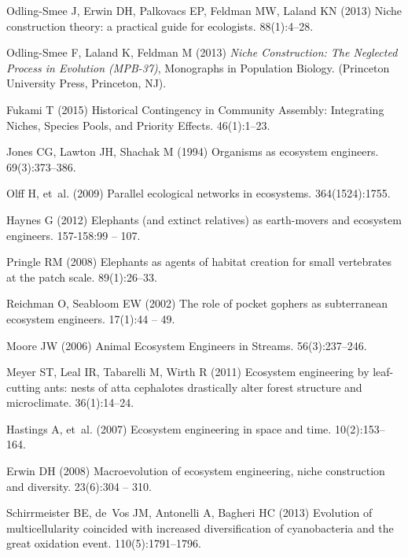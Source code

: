 \documentclass[9pt,twocolumn,twoside]{pnas-new}
\begin{document}
\begin{thebibliography}{10}
Odling-Smee J, Erwin DH, Palkovacs EP, Feldman MW, Laland KN (2013) {Niche
  construction theory: a practical guide for ecologists.}
 88(1):4--28.

Odling-Smee F, Laland K, Feldman M (2013) {\em Niche Construction: The
  Neglected Process in Evolution (MPB-37)}, Monographs in Population Biology.
\newblock (Princeton University Press, Princeton, NJ).

Fukami T (2015) {Historical Contingency in Community Assembly: Integrating
  Niches, Species Pools, and Priority Effects}.
 46(1):1--23.

Jones CG, Lawton JH, Shachak M (1994) Organisms as ecosystem engineers.
 69(3):373--386.

Olff H, et~al. (2009) {Parallel ecological networks in ecosystems}.
 364(1524):1755.

Haynes G (2012) Elephants (and extinct relatives) as earth-movers and ecosystem
  engineers.
 157-158:99 -- 107.

Pringle RM (2008) Elephants as agents of habitat creation for small vertebrates
  at the patch scale.
 89(1):26--33.

Reichman O, Seabloom EW (2002) The role of pocket gophers as subterranean
  ecosystem engineers.
 17(1):44 -- 49.

Moore JW (2006) {Animal Ecosystem Engineers in Streams}.
 56(3):237--246.

Meyer ST, Leal IR, Tabarelli M, Wirth R (2011) Ecosystem engineering by
  leaf-cutting ants: nests of atta cephalotes drastically alter forest
  structure and microclimate.
 36(1):14--24.

Hastings A, et~al. (2007) {Ecosystem engineering in space and time}.
 10(2):153--164.

Erwin DH (2008) Macroevolution of ecosystem engineering, niche construction and
  diversity.
 23(6):304 -- 310.

Schirrmeister BE, de~Vos JM, Antonelli A, Bagheri HC (2013) Evolution of
  multicellularity coincided with increased diversification of cyanobacteria
  and the great oxidation event.
 110(5):1791--1796.


\end{thebibliography}
\end{document}
